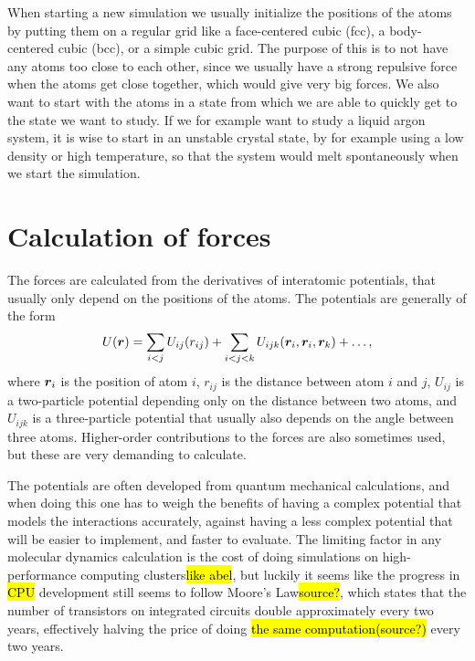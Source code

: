 When starting a new simulation we usually initialize the positions of the atoms by putting them on a regular grid like a face-centered cubic (fcc), a body-centered cubic (bcc), or a simple cubic grid. The purpose of this is to not have any atoms too close to each other, since we usually have a strong repulsive force when the atoms get close together, which would give very big forces. We also want to start with the atoms in a state from which we are able to quickly get to the state we want to study. If we for example want to study a liquid argon system, it is wise to start in an unstable crystal state, by for example using a low density or high temperature, so that the system would melt spontaneously when we start the simulation.

\section{Calculation of forces\label{sec:program:lj}}
The forces are calculated from the derivatives of interatomic potentials, that usually only depend on the positions of the atoms. The potentials are generally of the form
\begin{align*}
    U(\boldsymbol{r}) = \sum_{i<j} U_{ij}(r_{ij}) + \sum_{i<j<k} U_{ijk}(\boldsymbol{r}_i, \boldsymbol{r}_i, \boldsymbol{r}_k) + \dots,
\end{align*}
where $\boldsymbol{r}_i$ is the position of atom $i$, $r_{ij}$ is the distance between atom $i$ and $j$, $U_{ij}$ is a two-particle potential depending only on the distance between two atoms, and $U_{ijk}$ is a three-particle potential that usually also depends on the angle between three atoms. Higher-order contributions to the forces are also sometimes used, but these are very demanding to calculate.

The potentials are often developed from quantum mechanical calculations, and when doing this one has to weigh the benefits of having a complex potential that models the interactions accurately, against having a less complex potential that will be easier to implement, and faster to evaluate. The limiting factor in any molecular dynamics calculation is the cost of doing simulations on high-performance computing clusters\hl{like abel}, but luckily it seems like the progress in \hl{CPU} development still seems to follow Moore's Law\hl{source?}, which states that the number of transistors on integrated circuits double approximately every two years\cite{moore1965cramming}, effectively halving the price of doing \hl{the same computation}\hl{(source?)} every two years.

